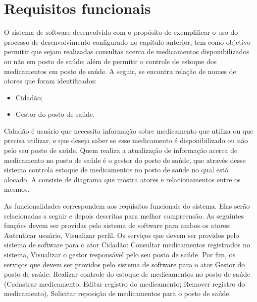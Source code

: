 

\section{Requisitos funcionais}
\label{sec:visão do sistema}

O sistema de software desenvolvido com o propósito de  exemplificar o uso do processo de desenvolvimento configurado no capítulo anterior, tem como objetivo permitir que sejam realizadas consultas acerca de medicamentos disponibilizados ou não em posto de saúde; além de permitir o controle de estoque dos medicamentos em posto de saúde. A seguir, se encontra relação de nomes de atores que foram identificados:

\begin{itemize}
    \item Cidadão;
    \item Gestor do posto de saúde.
\end{itemize}

%

Cidadão é usuário que necessita informação sobre medicamento que utiliza ou que precisa utilizar, e que deseja saber se esse medicamento é disponibilizado ou não pelo seu posto de saúde. Quem realiza a atualização de informação acerca de medicamento no posto de saúde é o gestor do posto de saúde, que através desse sistema controla estoque de medicamentos no posto de saúde no qual está alocado. A  consiste de diagrama que mostra atores e relacionamentos entre os mesmos.

As funcionalidades correspondem aos requisitos funcionais do sistema. Elas serão relacionadas a seguir e depois descritas para melhor compreensão. As seguintes funções devem ser providas pelo sistema de software para ambos os atores: Autenticar usuário, Visualizar perfil. Os serviços que devem ser providos pelo sistema de software para o ator Cidadão: Consultar medicamentos registrados no sistema, Visualizar o gestor responsável pelo seu posto de saúde. Por fim, os serviços que devem ser providos pelo sistema de software para o ator Gestor do posto de saúde: Realizar controle do estoque de medicamentos no posto de saúde (Cadastrar medicamento; Editar registro do medicamento; Remover registro do medicamento), Solicitar reposição de medicamentos para o posto de saúde.

